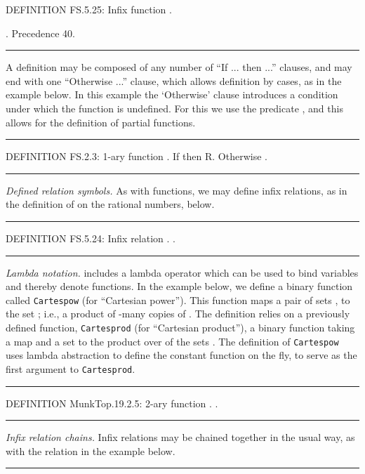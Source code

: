 \documentclass{llncs}
\newcommand{\myrule}{\noindent \rule{\textwidth}{0.3mm}}
\begin{document}
\noindent DEFINITION FS.5.25: Infix function . 

\noindent . Precedence 40.

\myrule

\medskip
A definition may be composed of any number of ``If ... then ...'' clauses, and may end with one ``Otherwise ...'' clause, which allows definition by cases, as in the example below. In this example the `Otherwise' clause introduces a condition under which the function is undefined. For this we use the predicate , and this allows for the definition of partial functions.

\medskip

\myrule

\noindent DEFINITION FS.2.3: 1-ary function . If
 then R. Otherwise
.

\myrule

\bigskip

\noindent \emph{Defined relation symbols.} As with functions, we may define infix relations, as in the definition of  on the rational numbers, below.
\medskip

\myrule

\noindent DEFINITION FS.5.24: Infix relation
. .

\myrule

\bigskip

\noindent \emph{Lambda notation.}  includes a lambda operator
which can be used to bind variables and thereby denote functions. In
the example below, we define a binary function called {\tt Cartespow}
(for ``Cartesian power''). This function maps a pair of sets , 
to the set ; i.e., a product of -many copies of . The
definition relies on a previously defined function, {\tt Cartesprod}
(for ``Cartesian product''), a binary function taking a map  and a
set  to the product over  of the sets . The
definition of {\tt Cartespow} uses lambda abstraction to define the
constant function  on the fly, to serve as the first
argument to {\tt Cartesprod}.

\medskip

\myrule

\noindent DEFINITION MunkTop.19.2.5: 2-ary function
. .

\myrule

\bigskip

\noindent \emph{Infix relation chains.} Infix relations may be chained
together in the usual way, as with the 
relation in the example below.

\medskip

\myrule
\end{document}
